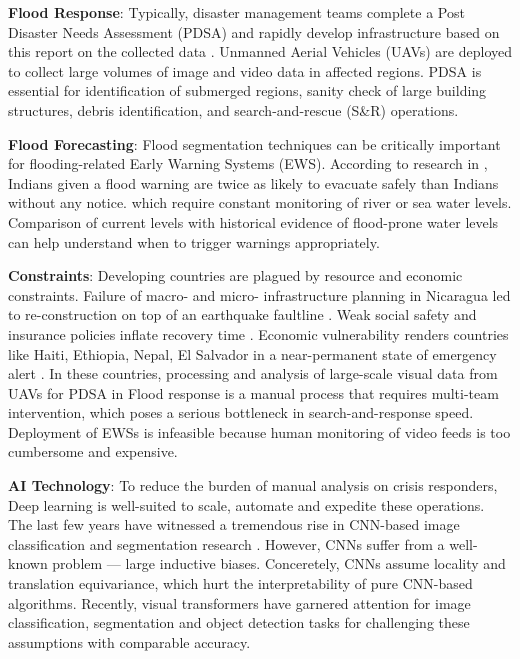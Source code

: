 \documentclass{article}
\begin{document}
\textbf{Flood Response}: Typically, disaster management teams complete a Post Disaster Needs Assessment (PDSA) and rapidly develop infrastructure based on this report on the collected data \cite{FEMA2016}. Unmanned Aerial Vehicles (UAVs) are deployed to collect large volumes of image and video data in affected regions. PDSA is essential for identification of submerged regions, sanity check of large building structures, debris identification, and search-and-rescue (S\&R) operations.

\textbf{Flood Forecasting}: Flood segmentation techniques can be critically important for flooding-related Early Warning Systems (EWS). According to research in \cite{flood-monitoring}, Indians given a flood warning are twice as likely to evacuate safely than Indians without any notice. which require constant monitoring of river or sea water levels. Comparison of current levels with historical evidence of flood-prone water levels can help understand when to trigger warnings appropriately. 

\textbf{Constraints}: Developing countries are plagued by resource and economic constraints. Failure of macro- and micro- infrastructure planning in Nicaragua led to re-construction on top of an earthquake faultline \cite{drawbacks}. Weak social safety and insurance policies inflate recovery time \cite{developing}.
Economic vulnerability renders countries like Haiti, Ethiopia, Nepal, El Salvador in a near-permanent state of emergency alert \cite{drawbacks}. In these countries, processing and analysis of large-scale visual data from UAVs for PDSA in Flood response is a manual process that requires multi-team intervention, which poses a serious bottleneck in search-and-response speed. Deployment of EWSs is infeasible because human monitoring of video feeds is too cumbersome and expensive.

\textbf{AI Technology}: To reduce the burden of manual analysis on crisis responders, Deep learning is well-suited to scale, automate and expedite these operations. 
The last few years have witnessed a tremendous rise in CNN-based image classification and segmentation research \cite{dl_survey}. However, CNNs suffer from a well-known problem — large inductive biases. Conceretely, CNNs assume locality and translation equivariance, which hurt the interpretability of pure CNN-based algorithms. Recently, visual transformers have garnered attention for image classification, segmentation and object detection tasks \cite{tf_class, Xie2021SegFormer,zhu2021deformable, transformers1} for challenging these assumptions with comparable accuracy.
\end{document}
